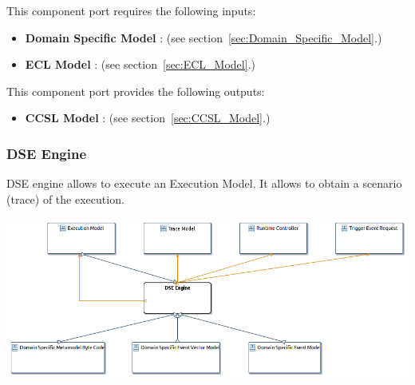 \documentclass{gemoc} %
\begin{document}
This component port requires the following inputs:
\begin{itemize}
  \item \textbf{Domain Specific Model} :
(see section~\ref{sec:Domain_Specific_Model}.)
  \item \textbf{ECL Model} :
(see section~\ref{sec:ECL_Model}.)
\end{itemize}

This component port provides the following outputs:
\begin{itemize}
  \item \textbf{CCSL Model} :
(see section~\ref{sec:CCSL_Model}.)
\end{itemize}



\subsubsection{DSE Engine}
\label{sec:DSE_Engine}
DSE engine allows to execute an Execution Model.
It allows to obtain a scenario (trace) of the execution.
\begin{center}
\includegraphics*[trim=0.0cm 0.0cm 0cm 0.0cm, clip=true]{../images/generated/Generated_DSE_Engine.png}
\end{center}
\end{document}
